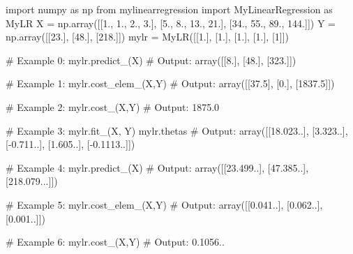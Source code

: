 \documentclass[]{article}
\newenvironment{Shaded}{\begin{snugshade}}{\end{snugshade}}
\newcommand{\CommentTok}[1]{\textcolor[rgb]{0.48,0.49,0.49}{#1}}
\newcommand{\DecValTok}[1]{\textcolor[rgb]{0.96,0.45,0.00}{#1}}
\newcommand{\FloatTok}[1]{\textcolor[rgb]{0.96,0.45,0.00}{#1}}
\newcommand{\ImportTok}[1]{\textcolor[rgb]{0.15,0.68,0.38}{#1}}
\newcommand{\NormalTok}[1]{\textcolor[rgb]{0.81,0.81,0.76}{#1}}
\newcommand{\OperatorTok}[1]{\textcolor[rgb]{0.81,0.81,0.76}{#1}}
\begin{document}
\begin{Shaded}
\begin{Highlighting}[]
\ImportTok{import}\NormalTok{ numpy }\ImportTok{as}\NormalTok{ np}
\ImportTok{from}\NormalTok{ mylinearregression }\ImportTok{import}\NormalTok{ MyLinearRegression }\ImportTok{as}\NormalTok{ MyLR}
\NormalTok{X }\OperatorTok{=}\NormalTok{ np.array([[}\FloatTok{1.}\NormalTok{, }\FloatTok{1.}\NormalTok{, }\FloatTok{2.}\NormalTok{, }\FloatTok{3.}\NormalTok{], [}\FloatTok{5.}\NormalTok{, }\FloatTok{8.}\NormalTok{, }\FloatTok{13.}\NormalTok{, }\FloatTok{21.}\NormalTok{], [}\FloatTok{34.}\NormalTok{, }\FloatTok{55.}\NormalTok{, }\FloatTok{89.}\NormalTok{, }\FloatTok{144.}\NormalTok{]])}
\NormalTok{Y }\OperatorTok{=}\NormalTok{ np.array([[}\FloatTok{23.}\NormalTok{], [}\FloatTok{48.}\NormalTok{], [}\FloatTok{218.}\NormalTok{]])}
\NormalTok{mylr }\OperatorTok{=}\NormalTok{ MyLR([[}\FloatTok{1.}\NormalTok{], [}\FloatTok{1.}\NormalTok{], [}\FloatTok{1.}\NormalTok{], [}\FloatTok{1.}\NormalTok{], [}\DecValTok{1}\NormalTok{]])}

\CommentTok{# Example 0:}
\NormalTok{mylr.predict_(X)}
\CommentTok{# Output:}
\NormalTok{array([[}\FloatTok{8.}\NormalTok{], [}\FloatTok{48.}\NormalTok{], [}\FloatTok{323.}\NormalTok{]])}

\CommentTok{# Example 1:}
\NormalTok{mylr.cost_elem_(X,Y)}
\CommentTok{# Output:}
\NormalTok{array([[}\FloatTok{37.5}\NormalTok{], [}\FloatTok{0.}\NormalTok{], [}\FloatTok{1837.5}\NormalTok{]])}

\CommentTok{# Example 2:}
\NormalTok{mylr.cost_(X,Y)}
\CommentTok{# Output:}
\FloatTok{1875.0}

\CommentTok{# Example 3:}
\NormalTok{mylr.fit_(X, Y)}
\NormalTok{mylr.thetas}
\CommentTok{# Output:}
\NormalTok{array([[}\DecValTok{18}\NormalTok{.}\DecValTok{023}\NormalTok{..], [}\DecValTok{3}\NormalTok{.}\DecValTok{323}\NormalTok{..], [}\OperatorTok{-}\DecValTok{0}\NormalTok{.}\DecValTok{711}\NormalTok{..], [}\DecValTok{1}\NormalTok{.}\DecValTok{605}\NormalTok{..], [}\OperatorTok{-}\DecValTok{0}\NormalTok{.}\DecValTok{1113}\NormalTok{..]])}

\CommentTok{# Example 4:}
\NormalTok{mylr.predict_(X)}
\CommentTok{# Output:}
\NormalTok{array([[}\DecValTok{23}\NormalTok{.}\DecValTok{499}\NormalTok{..], [}\DecValTok{47}\NormalTok{.}\DecValTok{385}\NormalTok{..], [}\DecValTok{218}\NormalTok{.}\DecValTok{079}\NormalTok{...]])}

\CommentTok{# Example 5:}
\NormalTok{mylr.cost_elem_(X,Y)}
\CommentTok{# Output:}
\NormalTok{array([[}\DecValTok{0}\NormalTok{.}\DecValTok{041}\NormalTok{..], [}\DecValTok{0}\NormalTok{.}\DecValTok{062}\NormalTok{..], [}\DecValTok{0}\NormalTok{.}\DecValTok{001}\NormalTok{..]])}

\CommentTok{# Example 6:}
\NormalTok{mylr.cost_(X,Y)}
\CommentTok{# Output:}
\DecValTok{0}\NormalTok{.}\DecValTok{1056}\NormalTok{..}
\end{Highlighting}
\end{Shaded}
\end{document}
